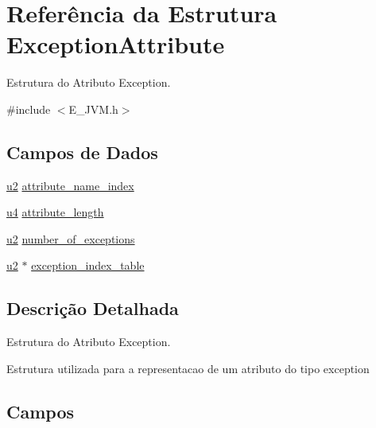 \hypertarget{struct_exception_attribute}{}\section{Referência da Estrutura Exception\+Attribute}
\label{struct_exception_attribute}


Estrutura do Atributo Exception.  




{\ttfamily \#include $<$E\+\_\+\+J\+V\+M.\+h$>$}

\subsection*{Campos de Dados}
\begin{DoxyCompactItemize}
\item 
\hyperlink{_e___j_v_m_8h_a5f223212eef04d10a4550ded680cb1cf}{u2} \hyperlink{struct_exception_attribute_a0d10afce4ebfc218924ec98121e2a37f}{attribute\+\_\+name\+\_\+index}
\item 
\hyperlink{_e___j_v_m_8h_aedf6ddc03df8caaaccbb4c60b9a9b850}{u4} \hyperlink{struct_exception_attribute_ab07437f9c5ab9682f41d7a36e146ed8a}{attribute\+\_\+length}
\item 
\hyperlink{_e___j_v_m_8h_a5f223212eef04d10a4550ded680cb1cf}{u2} \hyperlink{struct_exception_attribute_a389b17447aa3278771d0649f1df66e69}{number\+\_\+of\+\_\+exceptions}
\item 
\hyperlink{_e___j_v_m_8h_a5f223212eef04d10a4550ded680cb1cf}{u2} $\ast$ \hyperlink{struct_exception_attribute_aa1607cc18ce94ce03891d766a380d041}{exception\+\_\+index\+\_\+table}
\end{DoxyCompactItemize}


\subsection{Descrição Detalhada}
Estrutura do Atributo Exception. 

Estrutura utilizada para a representacao de um atributo do tipo exception 

\subsection{Campos}
\hypertarget{struct_exception_attribute_ab07437f9c5ab9682f41d7a36e146ed8a}{}
